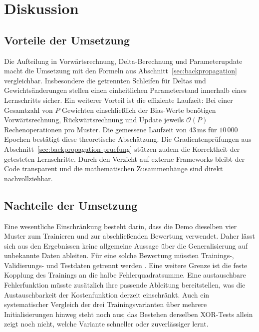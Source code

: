 \section{Diskussion}
\label{sec:diskussion}

\subsection{Vorteile der Umsetzung}
Die Aufteilung in Vorwärtsrechnung, Delta-Berechnung und Parameterupdate macht die Umsetzung mit den Formeln aus Abschnitt~\ref{sec:backpropagation} vergleichbar. Insbesondere die getrennten Schleifen für Deltas und Gewichtsänderungen stellen einen einheitlichen Parameterstand innerhalb eines Lernschritts sicher.
Ein weiterer Vorteil ist die effiziente Laufzeit: Bei einer Gesamtzahl von $P$ Gewichten einschließlich der Bias-Werte benötigen Vorwärtsrechnung, Rückwärtsrechnung und Update jeweils $\mathcal{O}(P)$ Rechenoperationen pro Muster. Die gemessene Laufzeit von $43\,\mathrm{ms}$ für $10\,000$ Epochen bestätigt diese theoretische Abschätzung. Die Gradientenprüfungen aus Abschnitt~\ref{sec:backpropagation-pruefung} stützen zudem die Korrektheit der getesteten Lernschritte. Durch den Verzicht auf externe Frameworks bleibt der Code transparent und die mathematischen Zusammenhänge sind direkt nachvollziehbar.

\subsection{Nachteile der Umsetzung}
Eine wesentliche Einschränkung besteht darin, dass die Demo dieselben vier Muster zum Trainieren und zur abschließenden Bewertung verwendet. Daher lässt sich aus den Ergebnissen keine allgemeine Aussage über die Generalisierung auf unbekannte Daten ableiten. Für eine solche Bewertung müssten Trainings-, Validierungs- und Testdaten getrennt werden \parencite[Folie~15]{vieten_sw03}.
Eine weitere Grenze ist die feste Kopplung des Trainings an die halbe Fehlerquadratsumme. Eine austauschbare Fehlerfunktion müsste zusätzlich ihre passende Ableitung bereitstellen, was die Austauschbarkeit der Kostenfunktion derzeit einschränkt. Auch ein systematischer Vergleich der drei Trainingsvarianten über mehrere Initialisierungen hinweg steht noch aus; das Bestehen derselben XOR-Tests allein zeigt noch nicht, welche Variante schneller oder zuverlässiger lernt.


